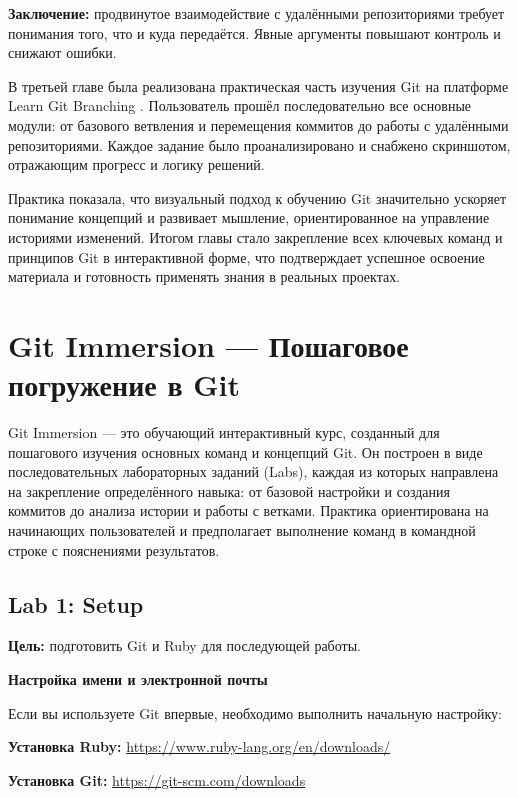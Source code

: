 \documentclass[a4paper,12pt]{report}
\begin{document}
\textbf{Заключение:} продвинутое взаимодействие с удалёнными репозиториями требует понимания того, что и куда передаётся. Явные аргументы повышают контроль и снижают ошибки.


В третьей главе была реализована практическая часть изучения Git на платформе Learn Git Branching \cite{learngitbranching}. Пользователь прошёл последовательно все основные модули: от базового ветвления и перемещения коммитов до работы с удалёнными репозиториями. Каждое задание было проанализировано и снабжено скриншотом, отражающим прогресс и логику решений.

Практика показала, что визуальный подход к обучению Git значительно ускоряет понимание концепций и развивает мышление, ориентированное на управление историями изменений. Итогом главы стало закрепление всех ключевых команд и принципов Git в интерактивной форме, что подтверждает успешное освоение материала и готовность применять знания в реальных проектах.


\chapter{Git Immersion — Пошаговое погружение в Git}\label{git_immersive_practice}

Git Immersion — это обучающий интерактивный курс, созданный для пошагового изучения основных команд и концепций Git. Он построен в виде последовательных лабораторных заданий (Labs), каждая из которых направлена на закрепление определённого навыка: от базовой настройки и создания коммитов до анализа истории и работы с ветками. Практика ориентирована на начинающих пользователей и предполагает выполнение команд в командной строке с пояснениями результатов.

\section{Lab 1: Setup}
\textbf{Цель:} подготовить Git и Ruby для последующей работы.

\textbf{Настройка имени и электронной почты}

Если вы используете Git впервые, необходимо выполнить начальную настройку:

\textbf{Установка Ruby:} \url{https://www.ruby-lang.org/en/downloads/}

\textbf{Установка Git:} \url{https://git-scm.com/downloads}
\end{document}
